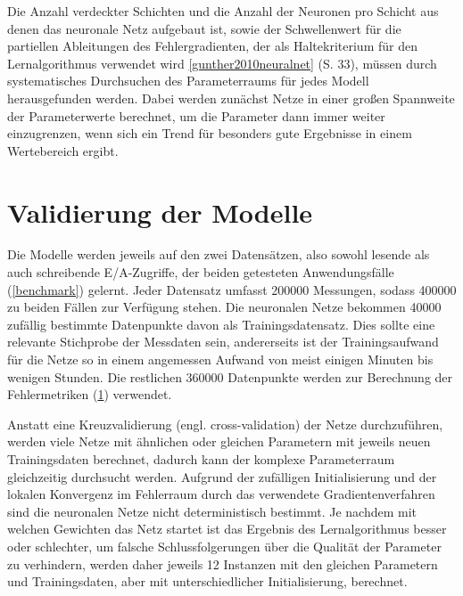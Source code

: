 \documentclass[
	12pt,
	a4paper,
	BCOR10mm,
	DIV14,
	listof=totoc,
	bibliography=totoc,
	headsepline
]{scrreprt}
\begin{document}
Die Anzahl verdeckter Schichten und die Anzahl der Neuronen pro Schicht aus denen das neuronale Netz aufgebaut ist, sowie der Schwellenwert für die partiellen Ableitungen des Fehlergradienten, der als Haltekriterium für den Lernalgorithmus verwendet wird \ref{gunther2010neuralnet} (S. 33), müssen durch systematisches Durchsuchen des Parameterraums für jedes Modell herausgefunden werden.
Dabei werden zunächst Netze in einer großen Spannweite der Parameterwerte berechnet, um die Parameter dann immer weiter einzugrenzen, wenn sich ein Trend für besonders gute Ergebnisse in einem Wertebereich ergibt.


\section{Validierung der Modelle}
\label{Validierung}

Die Modelle werden jeweils auf den zwei Datensätzen, also sowohl lesende als auch schreibende E/A-Zugriffe, der beiden getesteten Anwendungsfälle (\ref{benchmark}) gelernt. Jeder Datensatz umfasst 200000 Messungen, sodass 400000 zu beiden Fällen zur Verfügung stehen. Die neuronalen Netze bekommen 40000 zufällig bestimmte Datenpunkte davon als Trainingsdatensatz. Dies sollte eine relevante Stichprobe der Messdaten sein, andererseits ist der Trainingsaufwand für die Netze so in einem angemessen Aufwand von meist einigen Minuten bis wenigen Stunden. Die restlichen 360000 Datenpunkte werden zur Berechnung der Fehlermetriken (\ref{Validierung}) verwendet.

Anstatt eine Kreuzvalidierung (engl. cross-validation) der Netze durchzuführen, werden viele Netze mit ähnlichen oder gleichen Parametern mit jeweils neuen Trainingsdaten berechnet, dadurch kann der komplexe Parameterraum gleichzeitig durchsucht werden. Aufgrund der zufälligen Initialisierung und der lokalen Konvergenz im Fehlerraum durch das verwendete Gradientenverfahren sind die neuronalen Netze nicht deterministisch bestimmt. Je nachdem mit welchen Gewichten das Netz startet ist das Ergebnis des Lernalgorithmus besser oder schlechter, um falsche Schlussfolgerungen über die Qualität der Parameter zu verhindern, werden daher jeweils 12 Instanzen mit den gleichen Parametern und Trainingsdaten, aber mit unterschiedlicher Initialisierung, berechnet.
\end{document}
